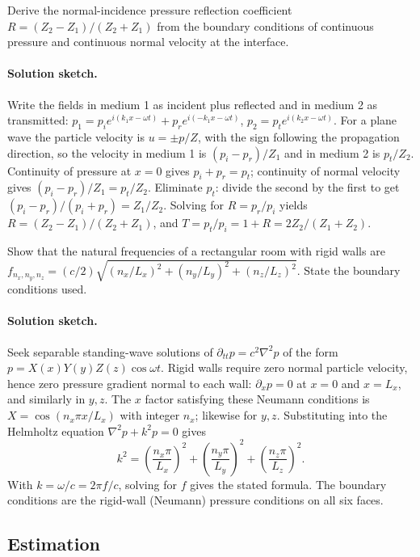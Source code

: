 \begin{exercise}
Derive the normal-incidence pressure reflection coefficient $R = (Z_2
- Z_1)/(Z_2 + Z_1)$ from the boundary conditions of continuous
pressure and continuous normal velocity at the interface.
\paragraph{Solution sketch.} Write the fields in medium 1 as incident
plus reflected and in medium 2 as transmitted:
$p_1 = p_i e^{i(k_1 x - \omega t)} + p_r e^{i(-k_1 x - \omega t)}$,
$p_2 = p_t e^{i(k_2 x - \omega t)}$. For a plane wave the particle
velocity is $u = \pm p/Z$, with the sign following the propagation
direction, so the velocity in medium 1 is $(p_i - p_r)/Z_1$ and in
medium 2 is $p_t/Z_2$. Continuity of pressure at $x=0$ gives
$p_i + p_r = p_t$; continuity of normal velocity gives
$(p_i - p_r)/Z_1 = p_t/Z_2$. Eliminate $p_t$: divide the second by the
first to get $(p_i - p_r)/(p_i + p_r) = Z_1/Z_2$. Solving for
$R = p_r/p_i$ yields $R = (Z_2 - Z_1)/(Z_2 + Z_1)$, and
$T = p_t/p_i = 1+R = 2Z_2/(Z_1+Z_2)$.
\end{exercise}

\begin{exercise}
Show that the natural frequencies of a rectangular room with rigid
walls are $f_{n_x, n_y, n_z} = (c/2)\sqrt{(n_x/L_x)^2 + (n_y/L_y)^2
+ (n_z/L_z)^2}$. State the boundary conditions used.
\paragraph{Solution sketch.} Seek separable standing-wave solutions of
$\partial_{tt}p = c^2\nabla^2 p$ of the form
$p = X(x)Y(y)Z(z)\cos\omega t$. Rigid walls require zero normal
particle velocity, hence zero pressure gradient normal to each wall:
$\partial_x p = 0$ at $x=0$ and $x=L_x$, and similarly in $y,z$. The
$x$ factor satisfying these Neumann conditions is
$X = \cos(n_x\pi x/L_x)$ with integer $n_x$; likewise for $y,z$.
Substituting into the Helmholtz equation $\nabla^2 p + k^2 p = 0$ gives
\[
k^2 = \left(\frac{n_x\pi}{L_x}\right)^2 +
\left(\frac{n_y\pi}{L_y}\right)^2 +
\left(\frac{n_z\pi}{L_z}\right)^2 .
\]
With $k = \omega/c = 2\pi f/c$, solving for $f$ gives the stated
formula. The boundary conditions are the rigid-wall (Neumann) pressure
conditions on all six faces.
\end{exercise}

\subsection*{Estimation}

